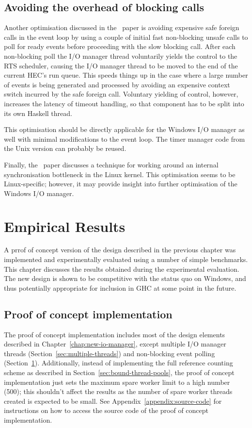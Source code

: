 \documentclass[a4paper,11pt,oneside]{report}
\begin{document}
\section{Avoiding the overhead of blocking calls}
\label{sec:avoiding-overhead}

Another optimisation discussed in the~\cite{bib:voellmy} paper is avoiding
expensive safe foreign calls in the event loop by using a couple of initial fast
non-blocking unsafe calls to poll for ready events before proceeding with the
slow blocking call. After each non-blocking poll the I/O manager thread
voluntarily yields the control to the RTS scheduler, causing the I/O manager
thread to be moved to the end of the current HEC's run queue. This speeds things
up in the case where a large number of events is being generated and processed
by avoiding an expensive context switch incurred by the safe foreign
call. Voluntary yielding of control, however, increases the latency of timeout
handling, so that component has to be split into its own Haskell thread.

This optimisation should be directly applicable for the Windows I/O manager as
well with minimal modifications to the event loop. The timer manager code from
the Unix version can probably be reused.

Finally, the~\cite{bib:voellmy} paper discusses a technique for working around
an internal synchronisation bottleneck in the Linux kernel. This optimisation
seems to be Linux-specific; however, it may provide insight into further
optimisation of the Windows I/O manager.

\chapter{Empirical Results}
\label{chap:evaluation}

A prrof of concept version of the design described in the previous chapter was
implemented and experimentally evaluated using a number of simple
benchmarks. This chapter discusses the results obtained during the experimental
evaluation. The new design is shown to be competitive with the status quo on
Windows, and thus potentially appropriate for inclusion in GHC at some point in
the future.

\section{Proof of concept implementation}

The proof of concept implementation includes most of the design elements
described in Chapter~\ref{chap:new-io-manager}, except multiple I/O manager
threads (Section~\ref{sec:multiple-threads}) and non-blocking event polling
(Section~\ref{sec:avoiding-overhead}). Additionally, instead of implementing the
full reference counting scheme as described in
Section~\ref{sec:bound-thread-pools}, the proof of concept implementation just
sets the maximum spare worker limit to a high number (500); this shouldn't
affect the results as the number of spare worker threads created is expected to
be small. See Appendix~\ref{appendix:source-code} for instructions on how to
access the source code of the proof of concept implementation.
\end{document}
